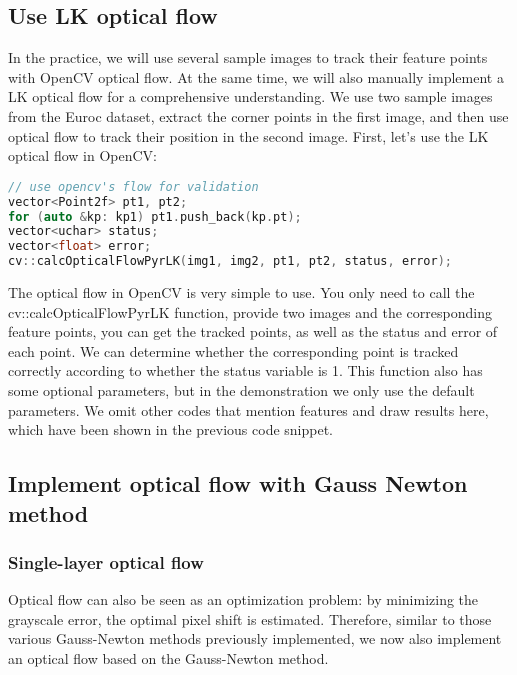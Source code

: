 %
\subsection{Use LK optical flow}
In the practice, we will use several sample images to track their feature points with OpenCV optical flow. At the same time, we will also manually implement a LK optical flow for a comprehensive understanding. We use two sample images from the Euroc dataset, extract the corner points in the first image, and then use optical flow to track their position in the second image. First, let's use the LK optical flow in OpenCV:

\begin{lstlisting}[language=c++,caption=slambook2/ch8/optical_flow.cpp (snippet))]
// use opencv's flow for validation
vector<Point2f> pt1, pt2;
for (auto &kp: kp1) pt1.push_back(kp.pt);
vector<uchar> status;
vector<float> error;
cv::calcOpticalFlowPyrLK(img1, img2, pt1, pt2, status, error);
\end{lstlisting}

The optical flow in OpenCV is very simple to use. You only need to call the cv::calcOpticalFlowPyrLK function, provide two images and the corresponding feature points, you can get the tracked points, as well as the status and error of each point. We can determine whether the corresponding point is tracked correctly according to whether the status variable is 1. This function also has some optional parameters, but in the demonstration we only use the default parameters. We omit other codes that mention features and draw results here, which have been shown in the previous code snippet.

\subsection{Implement optical flow with Gauss Newton method}
\subsubsection{Single-layer optical flow}
Optical flow can also be seen as an optimization problem: by minimizing the grayscale error, the optimal pixel shift is estimated. Therefore, similar to those various Gauss-Newton methods previously implemented, we now also implement an optical flow based on the Gauss-Newton method.

